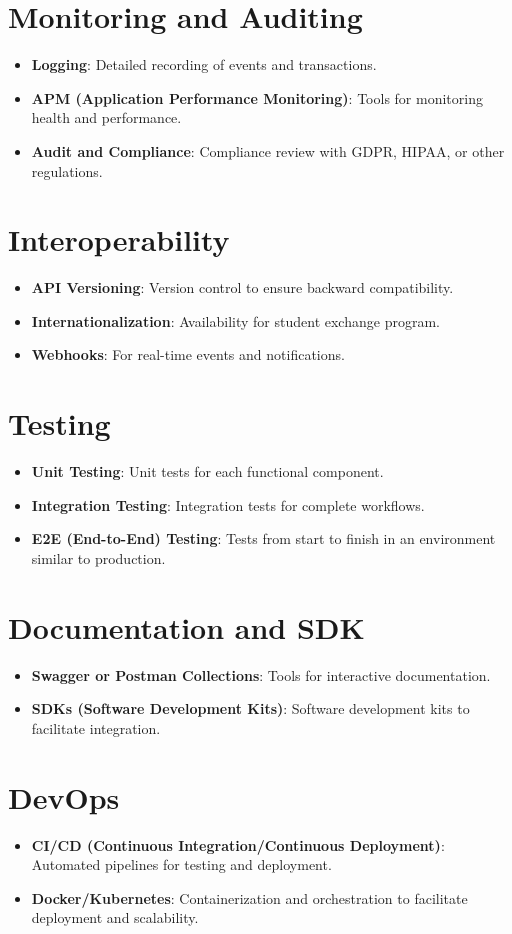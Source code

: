 \documentclass[12pt]{article}
\begin{document}
\section{Monitoring and Auditing}
\begin{itemize}
    \item \textbf{Logging}: Detailed recording of events and transactions.
    \item \textbf{APM (Application Performance Monitoring)}: Tools for monitoring health and performance.
    \item \textbf{Audit and Compliance}: Compliance review with GDPR, HIPAA, or other regulations.
\end{itemize}

\section{Interoperability}
\begin{itemize}
    \item \textbf{API Versioning}: Version control to ensure backward compatibility.
    \item \textbf{Internationalization}: Availability for student exchange program.
    \item \textbf{Webhooks}: For real-time events and notifications.
\end{itemize}

\section{Testing}
\begin{itemize}
    \item \textbf{Unit Testing}: Unit tests for each functional component.
    \item \textbf{Integration Testing}: Integration tests for complete workflows.
    \item \textbf{E2E (End-to-End) Testing}: Tests from start to finish in an environment similar to production.
\end{itemize}

\section{Documentation and SDK}
\begin{itemize}
    \item \textbf{Swagger or Postman Collections}: Tools for interactive documentation.
    \item \textbf{SDKs (Software Development Kits)}: Software development kits to facilitate integration.
\end{itemize}

\section{DevOps}
\begin{itemize}
    \item \textbf{CI/CD (Continuous Integration/Continuous Deployment)}: Automated pipelines for testing and deployment.
    \item \textbf{Docker/Kubernetes}: Containerization and orchestration to facilitate deployment and scalability.
\end{itemize}
\end{document}

